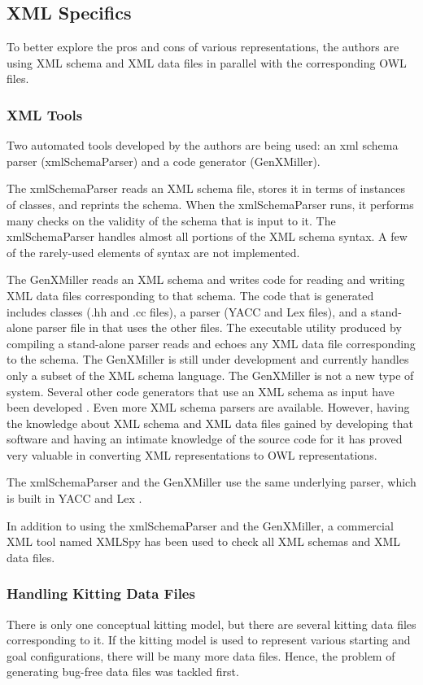 \subsection{XML Specifics}
To better explore the pros and cons of various representations,
the authors are using XML schema and XML data files in parallel with the
corresponding OWL files.

\subsubsection{XML Tools}
Two automated tools developed by the authors are being used: an xml schema
parser (xmlSchemaParser) and a code generator (GenXMiller).

The xmlSchemaParser reads an XML schema file, stores it in terms of
instances of {\cpp} classes, and reprints the schema. When the xmlSchemaParser
runs, it performs many checks on the validity of the schema that is input
to it. The xmlSchemaParser handles almost all portions of the XML schema
syntax. A few of the rarely-used elements of syntax are not implemented.

The GenXMiller reads an XML schema and writes code for reading and writing
XML data files corresponding to that schema. The code that is generated
includes {\cpp} classes (.hh and .cc files), a parser (YACC and Lex files), and
a stand-alone parser file in {\cpp} that uses the other files.  The executable
utility produced by compiling a stand-alone parser reads and echoes any XML
data file corresponding to the schema. The GenXMiller is still under
development and currently handles only a subset of the XML schema language.
The GenXMiller is not a
new type of system. Several other code generators that use an XML schema
as input have been developed \cite{XMLSchema1,ApacheXML}.
Even more XML schema parsers are
available. However, having the knowledge about XML schema and XML data
files gained by developing that software and having an intimate knowledge
of the source code for it has proved very valuable in converting XML representations
to OWL representations.

The xmlSchemaParser and the GenXMiller use the same underlying parser,
which is built in YACC and Lex \cite{LexAndYACC}.

In addition to using the xmlSchemaParser and the GenXMiller, a commercial
XML tool named XMLSpy \cite{XMLSpyManual} has been used to check all XML
schemas and XML data files.

\subsubsection{Handling Kitting Data Files}
There is only one conceptual kitting model, but there are several kitting
data files corresponding to it. If the kitting model is used to represent
various starting and goal configurations, there
will be many more data files. Hence, the problem of generating bug-free
data files was tackled first.


